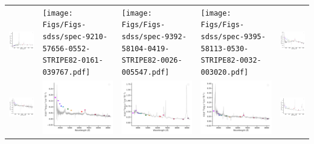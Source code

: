 \begin{center}
\begin{longtable}{l l l l l }
    \includegraphics[width=0.19\linewidth, clip]{Figs/Figs-sdss/spec-9207-57667-0050-STRIPE82-0148-001139.pdf} & \texttt{[image: Figs/Figs-sdss/spec-9210-57656-0552-STRIPE82-0161-039767.pdf]} & \texttt{[image: Figs/Figs-sdss/spec-9392-58104-0419-STRIPE82-0026-005547.pdf]} & \texttt{[image: Figs/Figs-sdss/spec-9395-58113-0530-STRIPE82-0032-003020.pdf]} & \includegraphics[width=0.19\linewidth, clip]{Figs/Figs-sdss/spec-9403-58018-0690-STRIPE82-0002-034805.pdf} \\
    \includegraphics[width=0.19\linewidth, clip]{Figs/Figs-sdss/spec-9405-58048-0414-STRIPE82-0009-022679.pdf} & \includegraphics[width=0.19\linewidth, clip]{Figs/Figs-sdss/spec-9406-58067-0121-STRIPE82-0007-021121.pdf} & \includegraphics[width=0.19\linewidth, clip]{Figs/Figs-sdss/spec-9406-58067-0648-STRIPE82-0006-027457.pdf} & \includegraphics[width=0.19\linewidth, clip]{Figs/Figs-sdss/spec-9406-58067-0764-STRIPE82-0008-036347.pdf} & \includegraphics[width=0.19\linewidth, clip]{Figs/Figs-sdss/spec-9407-58041-0415-STRIPE82-0004-031191.pdf} \\

\end{longtable}
\end{center}
